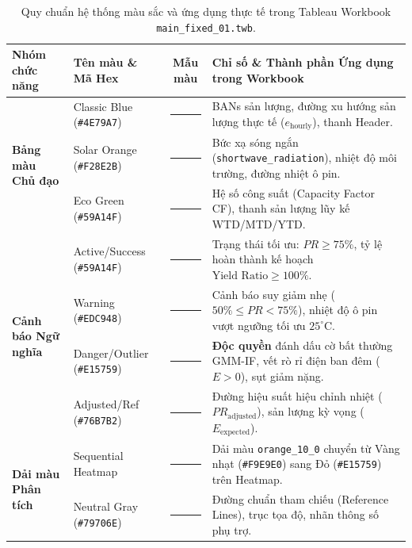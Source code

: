 \documentclass[12pt, a4paper]{report}
\begin{document}
\begin{table}[H]
\centering
\small
\renewcommand{\arraystretch}{1.3}
\begin{tabularx}{\textwidth}{@{} l l c X @{}}
\toprule
\textbf{Nhóm chức năng} & \textbf{Tên màu \& Mã Hex} & \textbf{Mẫu màu} & \textbf{Chỉ số \& Thành phần Ứng dụng trong Workbook} \\
\midrule
\multirow{3}{*}{\textbf{Bảng màu Chủ đạo}} 
& Classic Blue (\texttt{\#4E79A7}) & \textcolor{tblNavy}{\rule{1.2cm}{0.3cm}} & BANs sản lượng, đường xu hướng sản lượng thực tế ($e_{\text{hourly}}$), thanh Header. \\
& Solar Orange (\texttt{\#F28E2B}) & \textcolor{tblOrange}{\rule{1.2cm}{0.3cm}} & Bức xạ sóng ngắn (\texttt{shortwave\_radiation}), nhiệt độ môi trường, đường nhiệt ô pin. \\
& Eco Green (\texttt{\#59A14F}) & \textcolor{tblGreen}{\rule{1.2cm}{0.3cm}} & Hệ số công suất (Capacity Factor CF), thanh sản lượng lũy kế WTD/MTD/YTD. \\
\midrule
\multirow{4}{*}{\textbf{Cảnh báo Ngữ nghĩa}}
& Active/Success (\texttt{\#59A14F}) & \textcolor{tblGreen}{\rule{1.2cm}{0.3cm}} & Trạng thái tối ưu: $PR \ge 75\%$, tỷ lệ hoàn thành kế hoạch $\text{Yield Ratio} \ge 100\%$. \\
& Warning (\texttt{\#EDC948}) & \textcolor{tblYellow}{\rule{1.2cm}{0.3cm}} & Cảnh báo suy giảm nhẹ ($50\% \le PR < 75\%$), nhiệt độ ô pin vượt ngưỡng tối ưu $25^\circ\text{C}$. \\
& Danger/Outlier (\texttt{\#E15759}) & \textcolor{tblRed}{\rule{1.2cm}{0.3cm}} & \textbf{Độc quyền} đánh dấu cờ bất thường GMM-IF, vết rò rỉ điện ban đêm ($E > 0$), sụt giảm nặng. \\
& Adjusted/Ref (\texttt{\#76B7B2}) & \textcolor{tblTeal}{\rule{1.2cm}{0.3cm}} & Đường hiệu suất hiệu chỉnh nhiệt ($PR_{\text{adjusted}}$), sản lượng kỳ vọng ($E_{\text{expected}}$). \\
\midrule
\multirow{2}{*}{\textbf{Dải màu Phân tích}}
& Sequential Heatmap & \textcolor{tblSeqWarm}{\rule{1.2cm}{0.3cm}} & Dải màu \texttt{orange\_10\_0} chuyển từ Vàng nhạt (\texttt{\#F9E9E0}) sang Đỏ (\texttt{\#E15759}) trên Heatmap. \\
& Neutral Gray (\texttt{\#79706E}) & \textcolor{tblGray}{\rule{1.2cm}{0.3cm}} & Đường chuẩn tham chiếu (Reference Lines), trục tọa độ, nhãn thông số phụ trợ. \\
\bottomrule
\end{tabularx}
\caption{Quy chuẩn hệ thống màu sắc và ứng dụng thực tế trong Tableau Workbook \texttt{main\_fixed\_01.twb}.}
\label{tab:tableau_color_system}
\end{table}
\end{document}
